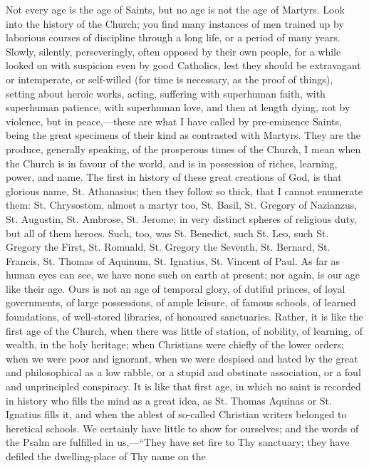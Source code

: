Not every age is the age of Saints, but no age is not
the age of Martyrs. Look into the history of the Church;
you find many instances of men trained up by laborious
courses of discipline through a long life, or a period of
many years. Slowly, silently, perseveringly, often
opposed by their own people, for a while looked on with
suspicion even by good Catholics, lest they should be
extravagant or intemperate, or self-willed (for time is
necessary, as the proof of things), setting about heroic
works, acting, suffering with superhuman faith, with
superhuman patience, with superhuman love, and then at
length dying, not by violence, but in peace,—these
are what I have called by pre-eminence Saints, being the
great specimens of their kind as contrasted with Martyrs.
They are the produce, generally speaking, of the
prosperous times of the Church, I mean when the Church is
in favour of the world, and is in possession of riches,
learning, power, and name. The first in history of these
great creations of God, is that glorious name, St.
Athanasius; then they follow so thick, that I cannot
enumerate them: St. Chrysostom, almost a martyr too, St.
Basil, St. Gregory of Nazianzus, St. Augustin, St.
Ambrose, St. Jerome; in very distinct spheres of
religious duty, but all of them heroes. Such, too, was
St. Benedict, such St. Leo, such St. Gregory the First,
St. Romuald, St. Gregory the Seventh, St. Bernard, St.
Francis, St. Thomas of Aquinum, St. Ignatius, St. Vincent
of Paul. As far as human eyes can see, we have none such
on earth at present; nor again, is our age like their
age. Ours is not an age of temporal glory, of dutiful
princes, of loyal governments, of large possessions, of
ample leisure, of famous schools, of learned foundations,
of well-stored libraries, of honoured sanctuaries.
Rather, it is like the first age of the Church, when
there was little of station, of nobility, of learning, of
wealth, in the holy heritage; when Christians were
chiefly of the lower orders; when we were poor and
ignorant, when we were despised and hated by the great
and philosophical as a low rabble, or a stupid and
obstinate association, or a foul and unprincipled
conspiracy. It is like that first age, in which no saint
is recorded in history who fills the mind as a great
idea, as St. Thomas Aquinas or St. Ignatius fills it, and
when the ablest of so-called Christian writers belonged
to heretical schools. We certainly have little to show
for ourselves; and the words of the Psalm are fulfilled
in us,—``They have set fire to Thy sanctuary;
they have defiled the dwelling-place of Thy name on the
